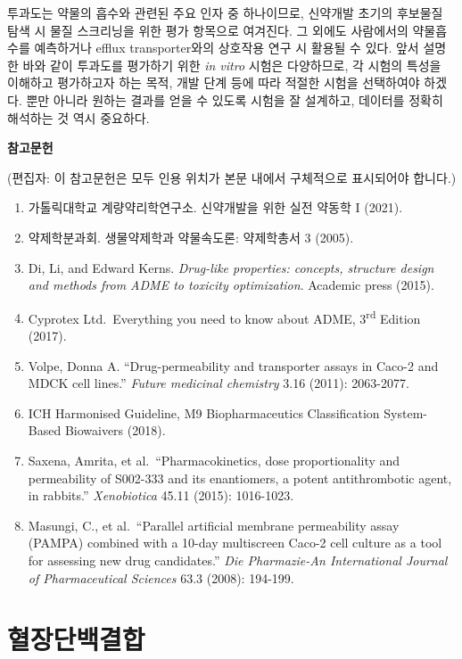 \documentclass[
  11pt,
  krantz2, a4paper, twoside]{krantz}
\providecommand{\tightlist}{%
  \setlength{\itemsep}{0pt}\setlength{\parskip}{0pt}}
\begin{document}
투과도는 약물의 흡수와 관련된 주요 인자 중 하나이므로, 신약개발 초기의
후보물질 탐색 시 물질 스크리닝을 위한 평가 항목으로 여겨진다. 그 외에도
사람에서의 약물흡수를 예측하거나 efflux transporter와의 상호작용 연구 시
활용될 수 있다. 앞서 설명한 바와 같이 투과도를 평가하기 위한 \emph{in vitro}
시험은 다양하므로, 각 시험의 특성을 이해하고 평가하고자 하는 목적, 개발
단계 등에 따라 적절한 시험을 선택하여야 하겠다. 뿐만 아니라 원하는
결과를 얻을 수 있도록 시험을 잘 설계하고, 데이터를 정확히 해석하는 것
역시 중요하다.

\textbf{참고문헌}

(편집자: 이 참고문헌은 모두 인용 위치가 본문 내에서 구체적으로
표시되어야 합니다.)

\begin{enumerate}
\def\labelenumi{\arabic{enumi}.}
\tightlist
\item
  가톨릭대학교 계량약리학연구소. 신약개발을 위한 실전 약동학 I (2021).
\item
  약제학분과회. 생물약제학과 약물속도론: 약제학총서 3 (2005).
\item
  Di, Li, and Edward Kerns. \emph{Drug-like properties: concepts, structure
  design and methods from ADME to toxicity optimization}. Academic
  press (2015).
\item
  Cyprotex Ltd.~Everything you need to know about ADME, 3\textsuperscript{rd} Edition
  (2017).
\item
  Volpe, Donna A. ``Drug-permeability and transporter assays in Caco-2
  and MDCK cell lines.'' \emph{Future medicinal chemistry} 3.16 (2011):
  2063-2077.
\item
  ICH Harmonised Guideline, M9 Biopharmaceutics Classification
  System-Based Biowaivers (2018).
\item
  Saxena, Amrita, et al.~``Pharmacokinetics, dose proportionality and
  permeability of S002-333 and its enantiomers, a potent
  antithrombotic agent, in rabbits.'' \emph{Xenobiotica} 45.11 (2015):
  1016-1023.
\item
  Masungi, C., et al.~``Parallel artificial membrane permeability assay
  (PAMPA) combined with a 10-day multiscreen Caco-2 cell culture as a
  tool for assessing new drug candidates.'' \emph{Die Pharmazie-An
  International Journal of Pharmaceutical Sciences} 63.3 (2008):
  194-199.
\end{enumerate}

\chapter{혈장단백결합}\label{uxd608uxc7a5uxb2e8uxbc31uxacb0uxd569}
\end{document}
